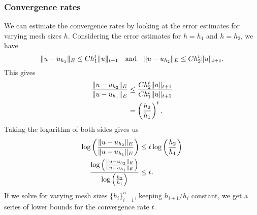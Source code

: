 \subsubsection{Convergence rates}
We can estimate the convergence rates by looking at the error estimates for varying mesh sizes $h$.
Considering the error estimates for $h = h_1$ and $h = h_2$, we have
\begin{equation*}
    \lVert u - u_{h_1}\rVert_E \leq C h_1^t \lVert u\rVert_{t + 1}
    \quad\text{and}\quad
    \lVert u - u_{h_2}\rVert_E \leq C h_2^t \lVert u\rVert_{t + 1}.
\end{equation*}
This gives
\begin{align*}
    \frac{\lVert u - u_{h_2}\rVert_E}{\lVert u - u_{h_1}\rVert_E}
    &\leq \frac{C h_2^t \lVert u\rVert_{t + 1}}{C h_1^t \lVert u\rVert_{t + 1}} \\
    &= \left(\frac{h_2}{h_1}\right)^t.
\end{align*}
Taking the logarithm of both sides gives us
\begin{align*}
    \log \left(\frac{\lVert u - u_{h_2}\rVert_E}{\lVert u - u_{h_1}\rVert_E}\right)
    &\leq t \log \left(\frac{h_2}{h_1}\right) \\
    \frac{
        \log \left(\frac{\lVert u - u_{h_2}\rVert_E}{\lVert u - u_{h_1}\rVert_E}\right)
    }{
        \log \left(\frac{h_2}{h_1}\right)
    }
    &\leq t.
\end{align*}
If we solve for varying mesh sizes $\{h_i\}_{i=1}^n$, keeping $h_{i+1} / h_i$ constant, we get a series of lower bounds for the convergence rate $t$.